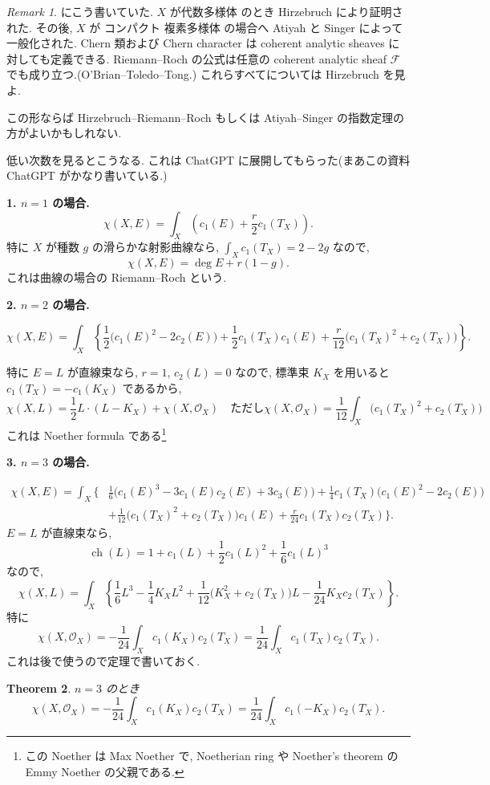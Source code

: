 \documentclass[dvipdfmx,a4paper,11pt]{article} %
\newtheorem{thm}{Theorem}[section]
\theoremstyle{definition}
\theoremstyle{remark}
\newtheorem{rem}[thm]{Remark}
\numberwithin{equation}{section}
\begin{document}
\begin{rem}
\cite{Kob14} にこう書いていた. \(X\) が代数多様体 のとき Hirzebruch により証明された. その後, \(X\) が コンパクト 複素多様体 の場合へ Atiyah と Singer によって一般化された. Chern 類および Chern character は coherent analytic sheaves に対しても定義できる. Riemann--Roch の公式は任意の coherent analytic sheaf \(\mathcal{F}\) でも成り立つ.(O'Brian--Toledo--Tong.) これらすべてについては Hirzebruch を見よ.

この形ならば Hirzebruch--Riemann--Roch もしくは Atiyah--Singer の指数定理の方がよいかもしれない.
\end{rem}


低い次数を見るとこうなる. これは ChatGPT に展開してもらった(まあこの資料 ChatGPT がかなり書いている.)

\noindent
\textbf{1. \(n=1\) の場合.}
\[
\chi(X,E)
=
\int_X
\left(
c_1(E)+\frac{r}{2}c_1(T_X)
\right).
\]
特に \(X\) が種数 \(g\) の滑らかな射影曲線なら,
\(
\int_X c_1(T_X)=2-2g
\)
なので,
\[
\chi(X,E)=\deg E+r(1-g).
\]
これは曲線の場合の Riemann--Roch という.

\noindent
\textbf{2. \(n=2\) の場合.}

\[
\chi(X,E)
=
\int_X
\left\{
\frac{1}{2}
\bigl(
c_1(E)^2-2c_2(E)
\bigr)
+
\frac{1}{2}c_1(T_X)c_1(E)
+
\frac{r}{12}
\bigl(
c_1(T_X)^2+c_2(T_X)
\bigr)
\right\}.
\]

特に \(E=L\) が直線束なら,
\(r=1\), \(c_2(L)=0\) なので, 標準束 \(K_X\) を用いると
\(
c_1(T_X)=-c_1(K_X)
\)
であるから,
\[
\chi(X,L)
=
\frac{1}{2}L\cdot(L-K_X)
+
\chi(X,\mathcal O_X)
\quad 
\text{ただし}
\chi(X,\mathcal O_X)
=
\frac{1}{12}
\int_X
\bigl(
c_1(T_X)^2+c_2(T_X)
\bigr)
\]
これは Noether formula である\footnote{この Noether は Max Noether で, Noetherian ring や Noether's theorem の Emmy Noether の父親である.}

\noindent
\textbf{3. \(n=3\) の場合.}

\[
\begin{aligned}
\chi(X,E)
=
\int_X
\Bigg\{
&
\frac{1}{6}
\bigl(
c_1(E)^3
-3c_1(E)c_2(E)
+3c_3(E)
\bigr)
+
\frac{1}{4}
c_1(T_X)
\bigl(
c_1(E)^2-2c_2(E)
\bigr)
\\
&+
\frac{1}{12}
\bigl(
c_1(T_X)^2+c_2(T_X)
\bigr)c_1(E)
+
\frac{r}{24}
c_1(T_X)c_2(T_X)
\Bigg\}.
\end{aligned}
\]
\(E=L\) が直線束なら,
\[
\operatorname{ch}(L)
=
1+c_1(L)+\frac{1}{2}c_1(L)^2+\frac{1}{6}c_1(L)^3
\]
なので,
\[
\chi(X,L)
=
\int_X
\left\{
\frac{1}{6}L^3
-\frac{1}{4}K_XL^2
+
\frac{1}{12}
\bigl(
K_X^2+c_2(T_X)
\bigr)L
-
\frac{1}{24}K_Xc_2(T_X)
\right\}.
\]
特に
\[
\chi(X,\mathcal O_X)
=
-\frac{1}{24}\int_X c_1(K_X)c_2(T_X)
=
\frac{1}{24}\int_X c_1(T_X)c_2(T_X).
\]
これは後で使うので定理で書いておく.
\begin{thm}
\label{thm-RR-3fold}
\(n=3\) のとき
\[
\chi(X,\mathcal O_X)
=
-\frac{1}{24}\int_X c_1(K_X)c_2(T_X)
=
\frac{1}{24}\int_X c_1(-K_X)c_2(T_X).
\]
\end{thm}
\end{document}
